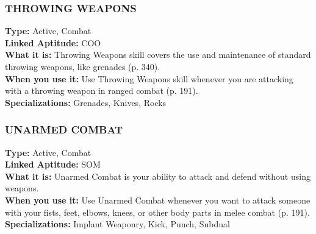 \subsubsection{THROWING WEAPONS} \textbf{Type:} Active, Combat \\ \textbf{Linked Aptitude:} COO \\ \textbf{What it is:} Throwing Weapons skill covers the use and maintenance of standard throwing weapons, like grenades (p. 340). \\ \textbf{When you use it:} Use Throwing Weapons skill whenever you are attacking with a throwing weapon in ranged combat (p. 191). \\ \textbf{Specializations:} Grenades, Knives, Rocks 







\subsubsection{UNARMED COMBAT} \textbf{Type:} Active, Combat \\ \textbf{Linked Aptitude:} SOM \\ \textbf{What it is:} Unarmed Combat is your ability to attack and defend without using weapons. \\ \textbf{When you use it:} Use Unarmed Combat whenever you want to attack someone with your fists, feet, elbows, knees, or other body parts in melee combat (p. 191). \\ \textbf{Specializations:} Implant Weaponry, Kick, Punch, Subdual 

